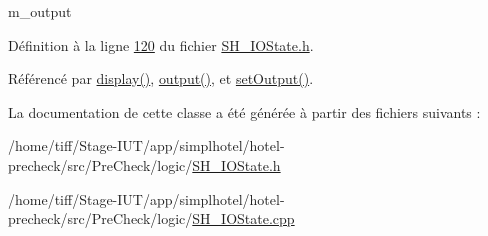 m\-\_\-output 



Définition à la ligne \hyperlink{SH__IOState_8h_source_l00120}{120} du fichier \hyperlink{SH__IOState_8h_source}{S\-H\-\_\-\-I\-O\-State.\-h}.



Référencé par \hyperlink{classSH__InOutState_a616f88b20478b81b2927a9ddc2b4f521}{display()}, \hyperlink{classSH__InOutState_a17ed7eaf5e3ed5af80a4f9fe65d5bfd9}{output()}, et \hyperlink{classSH__InOutState_af611c84134e262739cd834797b315c80}{set\-Output()}.



La documentation de cette classe a été générée à partir des fichiers suivants \-:\begin{DoxyCompactItemize}
\item 
/home/tiff/\-Stage-\/\-I\-U\-T/app/simplhotel/hotel-\/precheck/src/\-Pre\-Check/logic/\hyperlink{SH__IOState_8h}{S\-H\-\_\-\-I\-O\-State.\-h}\item 
/home/tiff/\-Stage-\/\-I\-U\-T/app/simplhotel/hotel-\/precheck/src/\-Pre\-Check/logic/\hyperlink{SH__IOState_8cpp}{S\-H\-\_\-\-I\-O\-State.\-cpp}\end{DoxyCompactItemize}
